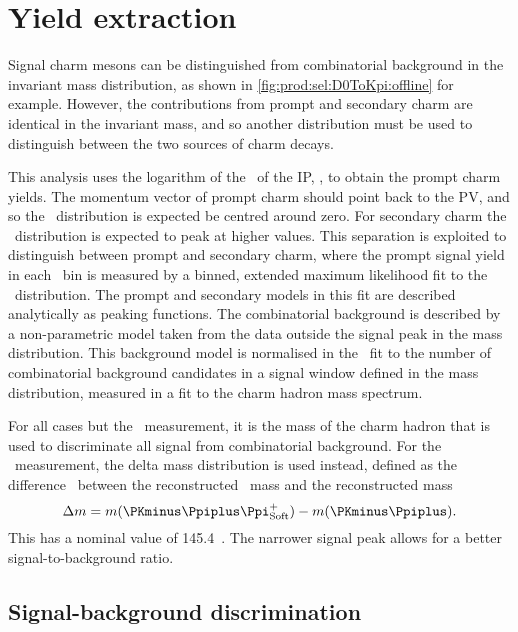 \chapter{Yield extraction}
\label{chap:prod:fitting}

Signal charm mesons can be distinguished from combinatorial background in the 
invariant mass distribution, as shown in \cref{fig:prod:sel:D0ToKpi:offline} 
for example.
However, the contributions from prompt and secondary charm are identical in the 
invariant mass, and so another distribution must be used to distinguish between 
the two sources of charm decays.

This analysis uses the logarithm of the \chisq\ of the \acl{IP}, \lnipchisq, to 
obtain the prompt charm yields.
The momentum vector of prompt charm should point back to the \ac{PV}, and so 
the \lnipchisq\ distribution is expected be centred around zero.
For secondary charm the \lnipchisq\ distribution is expected to peak at higher 
values.
This separation is exploited to distinguish between prompt and secondary charm, 
where the prompt signal yield in each \pTy\ bin is measured by a binned, 
extended maximum likelihood fit to the \lnipchisq\ distribution.
The prompt and secondary models in this fit are described analytically as 
peaking functions.
The combinatorial background is described by a non-parametric model taken from 
the data outside the signal peak in the mass distribution.
This background model is normalised in the \lnipchisq\ fit to the number of 
combinatorial background candidates in a signal window defined in the mass 
distribution, measured in a fit to the charm hadron mass spectrum.

For all cases but the \PDstarp\ measurement, it is the mass of the charm hadron 
that is used to discriminate all signal from combinatorial background.
For the \PDstarp\ measurement, the delta mass distribution is used instead, 
defined as the difference \deltam\ between the reconstructed \PDstarp\ mass and 
the reconstructed \PDzero mass
\begin{equation}
  \deltam = m(\PKminus\Ppiplus\Ppiplussoft) - m(\PKminus\Ppiplus).
  \label{eqn:prod:fitting:delta_mass}
\end{equation}
This has a nominal value of \SI{145.4}{\MeVcc}~\cite{PDG2014}.
The narrower signal peak allows for a better signal-to-background ratio.

\section{Signal-background discrimination}
\label{chap:prod:fitting:mass}

